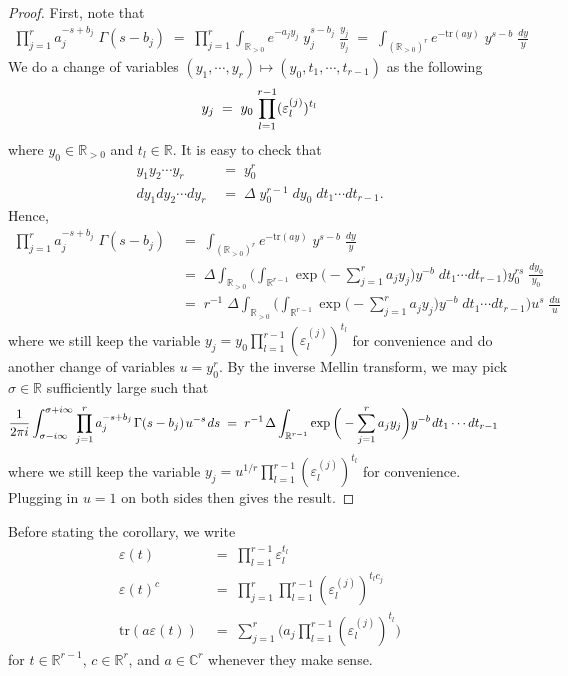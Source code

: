 \documentclass[11pt]{amsart}
\theoremstyle{remark}
\newcommand{\real}{\mathbb{R}}
\newcommand{\comp}{\mathbb{C}}
\newcommand{\eps}{\varepsilon}
\newcommand{\eq}{\;=\;}
\def\thin{{\hskip 1pt}}
\newcommand{\tr}{\mathrm{tr}}
\begin{document}
\begin{proof}
First, note that
\begin{align*}
    \prod_{j=1}^r a_j^{-s+b_j}\;\Gamma(s-b_j)\eq\prod_{j=1}^r\int_{\real_{>0}}e^{-a_jy_j}\; y_j^{s-b_j}\;\frac{y_j}{y_j} \eq\int_{(\real_{>0})^r}e^{-\tr(ay)}\;y^{s-b}\;\frac{dy}{y}
\end{align*}
We do a change of variables $(y_1,\cdots,y_r)\mapsto(y_0,t_1,\cdots,t_{r-1})$ as the following
\begin{align*}
    y_j\eq y_0\thin\prod_{l=1}^{r-1}(\eps_l^{(j)})^{t_l}
\end{align*}
where $y_0\in\real_{>0}$ and $t_l\in\real$. It is easy to check that
\begin{align*}
    y_1y_2\cdots y_r&\eq y_0^r \\
    dy_1dy_2\cdots dy_r&\eq \Delta\;y_0^{r-1}\;dy_0\;dt_1\cdots dt_{r-1}.
\end{align*}
Hence,
\begin{align*}
    \prod_{j=1}^r a_j^{-s+b_j}\;\Gamma(s-b_j)&\eq\int_{(\real_{>0})^r}e^{-\tr(ay)}\;y^{s-b}\;\frac{dy}{y} \\
    &\eq\Delta\int_{\real_{>0}}\bigg(\int_{\real^{r-1}}\exp\bigg(-\sum\limits_{j=1}^r a_jy_j\bigg)y^{-b}\;dt_1\cdots dt_{r-1}\bigg)y_0^{rs}\;\frac{dy_0}{y_0} \\
    &\eq r^{-1}\;\Delta\int_{\real_{>0}}\bigg(\int_{\real^{r-1}}\exp\bigg(-\sum\limits_{j=1}^r a_jy_j\bigg)y^{-b}\;dt_1\cdots dt_{r-1}\bigg)u^s\;\frac{du}{u}
\end{align*}
where we still keep the variable $y_j=y_0\prod_{l=1}^{r-1}(\eps_l^{(j)})^{t_l}$ for convenience and do another change of variables $u=y_0^r$. By the inverse Mellin transform, we may pick $\sigma\in\real$ sufficiently large such that
\begin{align*}
    &\frac{1}{2\pi i}\int_{\sigma-i\infty}^{\sigma+i\infty}\prod_{j=1}^r a_j^{-s+b_j}\thin\Gamma(s-b_j)\thin u^{-s}\thin ds\eq r^{-1}\thin\Delta\int_{\real^{r-1}}\exp\bigg(-\sum\limits_{j=1}^r a_jy_j\bigg)y^{-b}\thin dt_1\cdots dt_{r-1}
\end{align*}
where we still keep the variable $y_j=u^{1/r}\prod_{l=1}^{r-1}(\eps_l^{(j)})^{t_l}$ for convenience. Plugging in $u=1$ on both sides then gives the result.
\end{proof}

Before stating the corollary, we write
\begin{align*}
    \eps(t)&\eq \prod_{l=1}^{r-1}\eps_l^{t_l} \\
    \eps(t)^c&\eq\prod_{j=1}^r\prod_{l=1}^{r-1}(\eps_l^{(j)})^{t_lc_j} \\
    \tr(a\eps(t))&\eq\sum_{j=1}^r \bigg(a_j\prod_{l=1}^{r-1}(\eps_l^{(j)})^{t_l}\bigg)
\end{align*}
for $t\in\real^{r-1}$, $c\in\real^r$, and $a\in\comp^r$ whenever they make sense.
\end{document}
